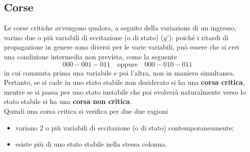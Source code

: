 \documentclass[a4paper]{extarticle}
\begin{document}
\vspace{1em}
\noindent
\subsection{Corse}
Le corse critiche avvengono qualora, a seguito della variazione di un ingresso, varino due o più variabili di eccitazione (o di stato) ($y'$): poiché i ritardi di propagazione in genere sono diversi per le varie variabili, può essere che si crei una condizione intermedia non prevista, come la seguente
\[000-001-011 \hspace{1em} \text{oppure} \hspace{1em} 000-010-011\]
in cui commuta prima una variabile e poi l'altra, non in maniera simultanea.\\
Pertanto, se si cade in uno stato stabile non desiderato si ha una \textbf{corsa critica}, mentre se si passa per uno stato instabile che poi evolverà naturalmente verso lo stato stabile si ha una \textbf{corsa non critica}.\\
Quindi una corsa critica si verifica per due due ragioni
\begin{itemize}
    \item variano $2$ o più variabili di eccitazione (o di stato) contemporaneamente;
    \item esiste più di uno stato stabile nella stessa colonna.
\end{itemize}
\end{document}
